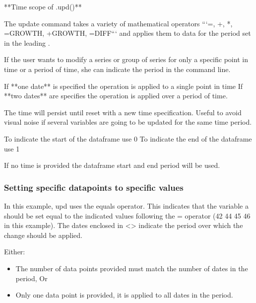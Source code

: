 \documentclass[letterpaper,10pt,english]{jupyterBook}
\begin{document}
\begin{sphinxVerbatim}[commandchars=\\\{\}]
**Time scope of .upd()**



The update command takes a variety of mathematical operators ```=, +, *, \PYGZpc{} =GROWTH, +GROWTH, =DIFF``` and applies them to data for the period set in the leading \PYGZlt{}\PYGZgt{}.

If the user wants to modify a series or group of series for only a specific point in time or a period of time, she can indicate the period in the command line.

 \PYGZhy{} If **one date** is specified the operation is applied to a single point in time
 \PYGZhy{} If **two dates**  are specifies the operation is applied over a period of time.

The time will persist until re\PYGZhy{}set with a new time specification. Useful to avoid visual noise if several variables are going to be updated for the same time period. 

 \PYGZhy{} To indicate the start of the dataframe use \PYGZhy{}0
 \PYGZhy{} To indicate the end of the dataframe use \PYGZhy{}1
 
If no time is provided the dataframe start and end period will be used.  
\end{sphinxVerbatim}


\subsubsection{Setting specific datapoints to specific values}
\label{\detokenize{content/04_PythonEssentials/UpdateCommand:setting-specific-datapoints-to-specific-values}}
\sphinxAtStartPar
In this example, upd uses the equals operator.  This indicates that the variable a should be set equal to the indicated values following the = operator (42 44 45 46 in this example). The dates enclosed in <> indicate the period over which the change should be applied.

\sphinxAtStartPar
Either:
\begin{itemize}
\item {} 
\sphinxAtStartPar
The number of data points provided must match the number of dates in the period, Or

\item {} 
\sphinxAtStartPar
Only one data point is provided, it is applied to all dates in the period.

\end{itemize}
\end{document}
